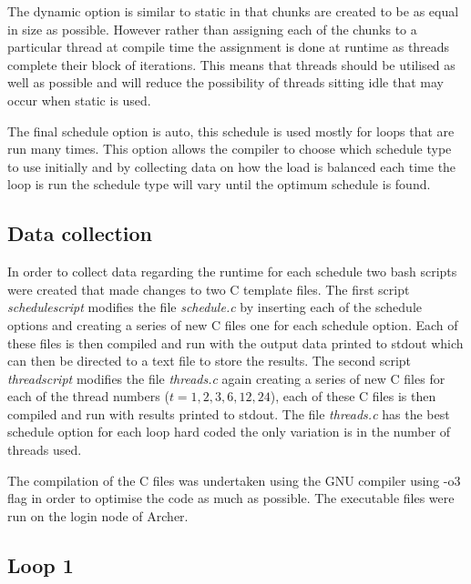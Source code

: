 \documentclass[12pt]{article} %
\begin{document}
The dynamic option is similar to static in that chunks are created to be as equal in size as possible. However rather than assigning each of the chunks to a particular thread at compile time the assignment is done at runtime as threads complete their block of iterations. This means that threads should be utilised as well as possible and will reduce the possibility of threads sitting idle that may occur when static is used.

The final schedule option is auto, this schedule is used mostly for loops that are run many times. This option allows the compiler to choose which schedule type to use initially and by collecting data on how the load is balanced each time the loop is run the schedule type will vary until the optimum schedule is found. 

\subsection{Data collection}

In order to collect data regarding the runtime for each schedule two bash scripts were created that made changes to two C template files. The first script \textit{schedulescript} modifies the file \textit{schedule.c} by inserting each of the schedule options and creating a series of new C files one for each schedule option. Each of these files is then compiled and run with the output data printed to stdout which can then be directed to a text file to store the results. The second script \textit{threadscript} modifies the file \textit{threads.c} again creating a series of new C files for each of the thread numbers ($t = 1,2,3,6,12,24$), each of these C files is then compiled and run with results printed to stdout. The file \textit{threads.c} has the best schedule option for each loop hard coded the only variation is in the number of threads used.  

The compilation of the C files was undertaken using the GNU compiler using -o3 flag in order to optimise the code as much as possible. The executable files were run on the login node of Archer.

\subsection{Loop 1}
\end{document}
